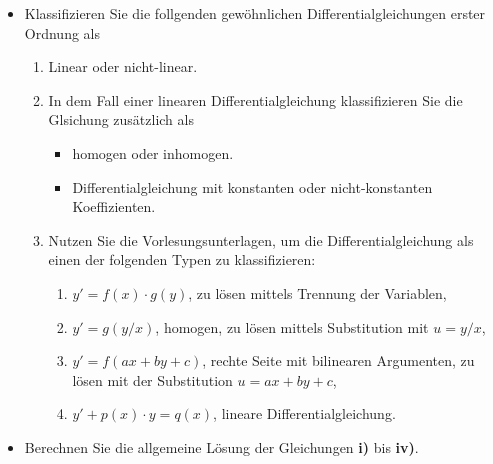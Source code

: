 {
\begin{itemize}
\item[\textbf{1)}] Klassifizieren Sie die follgenden gew\"ohnlichen Differentialgleichungen 
                   erster Ordnung als 

\begin{enumerate}
\item[\textbf{a)}] Linear oder nicht-linear.
\item[\textbf{b)}] In dem Fall einer linearen Differentialgleichung klassifizieren Sie 
                   die Glsichung zus\"atzlich als
\begin{itemize}
\item homogen oder inhomogen.
\item Differentialgleichung mit konstanten oder nicht-konstanten Koeffizienten.
\end{itemize}
\item[\textbf{c)}]  Nutzen Sie die Vorlesungsunterlagen, um die Differentialgleichung als
                    einen der folgenden Typen zu klassifizieren:
\begin{enumerate}
\item $y'= f(x)\cdot g(y)$, zu lösen mittels Trennung der Variablen,
\item $y'=g(y/x)$, homogen, zu l\"osen mittels Substitution mit $u=y/x$,
\item $y'=f(ax+by+c)$, rechte Seite mit bilinearen Argumenten, zu lösen mit der 
      Substitution $u=ax+by+c$,
\item $y'+p(x) \cdot y = q(x)$, lineare Differentialgleichung.
\end{enumerate}
\end{enumerate}
\begin{multicols}{2}
\end{multicols}
\item[\textbf{2)}] Berechnen Sie die allgemeine L\"osung der Gleichungen \textbf{i)} 
                   bis \textbf{iv)}.
\end{itemize}
}


